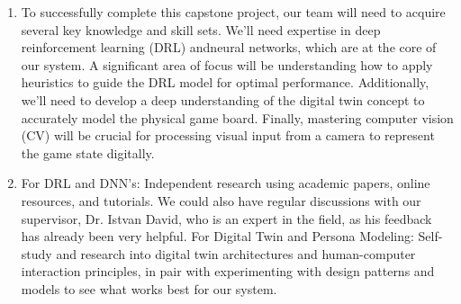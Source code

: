 \documentclass{article}
\begin{document}
\begin{enumerate}
    \item To successfully complete this capstone project, our team will need to acquire several key knowledge and skill sets.
    We'll need expertise in deep reinforcement learning (DRL) andneural networks, which are at the core of our system.
    A significant area of focus will be understanding how to apply heuristics to guide the DRL model for optimal performance.
    Additionally, we'll need to develop a deep understanding of the digital twin concept to accurately model the physical game board.
    Finally, mastering computer vision (CV) will be crucial for processing visual input from a camera to represent the game state digitally.

    \item For DRL and DNN's: Independent research using academic papers, online resources, and tutorials.
    We could also have regular discussions with our supervisor, Dr. Istvan David, who is an expert in the field, as his feedback has already been very helpful.
    For Digital Twin and Persona Modeling: Self-study and research into digital twin architectures and human-computer interaction principles, in pair with experimenting with design patterns and models to see what works best for our system.

\end{enumerate}
\end{document}
